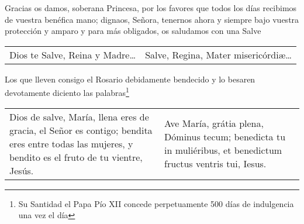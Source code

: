 \documentclass[../devocionario.tex]{subfiles}
\begin{document}
    \bigskip

    Gracias os damos, soberana Princesa, por los favores que todos los días recibimos de vuestra benéfica mano; dignaos, Señora, tenernos ahora 
    y siempre bajo vuestra protección y amparo y para más obligados, os saludamos con una Salve
    
    \bigskip

    \begin{tabular} { p{} p{} }
        Dios te Salve, Reina y Madre{\ldots} & Salve, Regina, Mater mi­se­ri­córdiæ{\ldots}
    \end{tabular}

    \bigskip

    Los que lleven consigo el Rosario debidamente bendecido y lo besaren devotamente diciento las palabras\footnote{Su Santidad el Papa Pío XII concede perpetuamente 500 días de indulgencia una vez el día}

    \bigskip

    \begin{tabular} { p{} p{} }
        Dios de salve, María, llena eres de gracia, el Señor es contigo; bendita eres entre todas las mujeres, 
        y bendito es el fruto de tu vientre, Jesús. & 
        Ave María, grátia plena, Dóminus tecum; benedicta tu in muliéribus, et benedictum fructus ventris tui, Iesus.
    \end{tabular}
\end{document}
